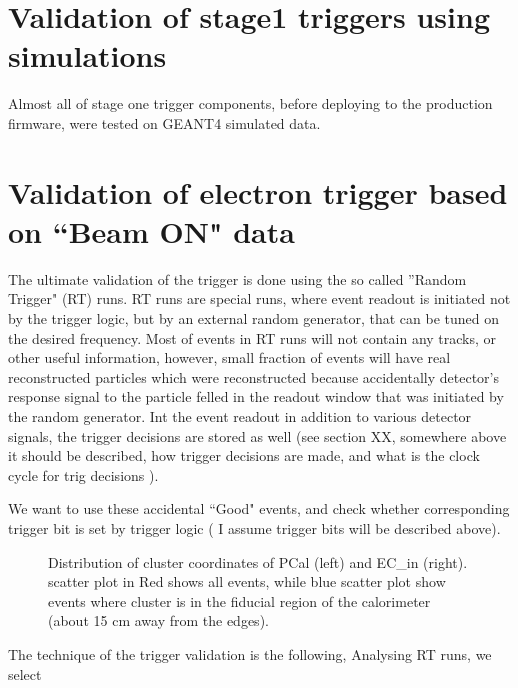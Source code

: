 
\section{Validation of stage1 triggers using simulations}
Almost all of stage one trigger components, before deploying to the production firmware, were tested on GEANT4 simulated data.

\section{Validation of electron trigger based on ``Beam ON" data}
The ultimate validation of the trigger is done using the so called ''Random Trigger" (RT) runs.
RT runs are special runs, where event readout is initiated not by the trigger logic, but by an external random generator, that
can be tuned on the desired frequency. Most of events in RT runs will not contain any tracks, or other useful information, however,
small fraction of events will have real reconstructed particles which were reconstructed because accidentally detector's response
signal to the particle felled in the readout window that was initiated by the random generator.
Int the event readout in addition to various detector signals, the trigger decisions are stored as well (see section {\color{Red} XX, somewhere above
it should be described, how trigger decisions are made, and what is the clock cycle for trig decisions }).

We want to use these accidental ``Good" events, and check whether corresponding trigger bit is set by trigger logic ({\color{Red} I assume
trigger bits will be described above}).
\begin{figure}[!htb]
 \centering
 \caption{Distribution of cluster coordinates of PCal (left) and EC\_{in} (right).
 scatter plot in Red shows all events, while blue scatter plot show events where cluster
 is in the fiducial region of the calorimeter (about 15 cm away from the edges).}
\end{figure}

The technique of the trigger validation is the following,
Analysing RT runs, we select 
